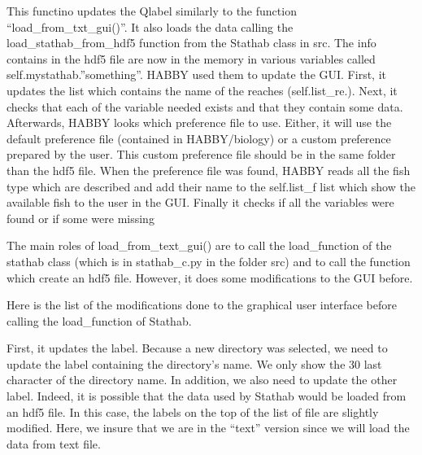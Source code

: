 \documentclass[letterpaper,10pt,english]{sphinxmanual}
\begin{document}
\begin{fulllineitems}
\begin{fulllineitems}

This functino updates the Qlabel similarly to the function “load\_from\_txt\_gui()”.
It also loads the data calling the load\_stathab\_from\_hdf5 function from the Stathab class in src. The info
contains in the hdf5 file are now in the memory in various variables called self.mystathab.”something”.
HABBY used them to update the GUI. First, it updates the list which contains the name of the reaches
(self.list\_re.). Next, it checks that each of the variable needed exists and that they contain some data.
Afterwards, HABBY looks which preference file to use. Either, it will use the default preference file
(contained in HABBY/biology) or a custom preference prepared by the user. This custom preference
file should be in the same folder than the hdf5 file. When the preference file was found, HABBY reads all
the fish type which are described and add their name to the self.list\_f list which show the available fish
to the user in the GUI. Finally it checks if all the variables were found or if some were missing

\end{fulllineitems}


\begin{fulllineitems}
\label{\detokenize{index:src_GUI.stathab_GUI.StathabW.load_from_txt_gui}}
The main roles of load\_from\_text\_gui() are to call the load\_function of the stathab class (which is in
stathab\_c.py in the folder src) and to call the function which create an hdf5 file. However, it does some
modifications to the GUI before.


Here is the list of the modifications done to the graphical user interface before calling the load\_function of
Stathab.

First, it updates the label. Because a new directory was selected, we need to update the label containing the
directory’s name. We only show the 30 last character of the directory name. In addition, we also need to update
the other label. Indeed, it is possible that the data used by Stathab would be loaded from an hdf5 file.
In this case, the labels on the top of the list of file are slightly modified. Here, we insure that we are in
the “text” version since we will load the data from text file.


\end{fulllineitems}
\end{fulllineitems}
\end{document}
